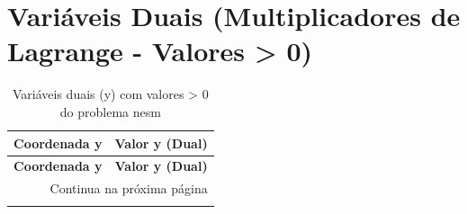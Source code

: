 \documentclass[12pt]{article}
\begin{document}
\section{Variáveis Duais (Multiplicadores de Lagrange - Valores > 0)}

\begin{longtable}{@{}cc@{}}
\caption{Variáveis duais (y) com valores > 0 do problema nesm} \\
\toprule
\textbf{Coordenada y} & \textbf{Valor y (Dual)} \\
\midrule
\endfirsthead

\toprule
\textbf{Coordenada y} & \textbf{Valor y (Dual)} \\
\midrule
\endhead

\midrule \multicolumn{2}{r}{{Continua na próxima página}} \\ \midrule
\endfoot


\end{longtable}
\end{document}
